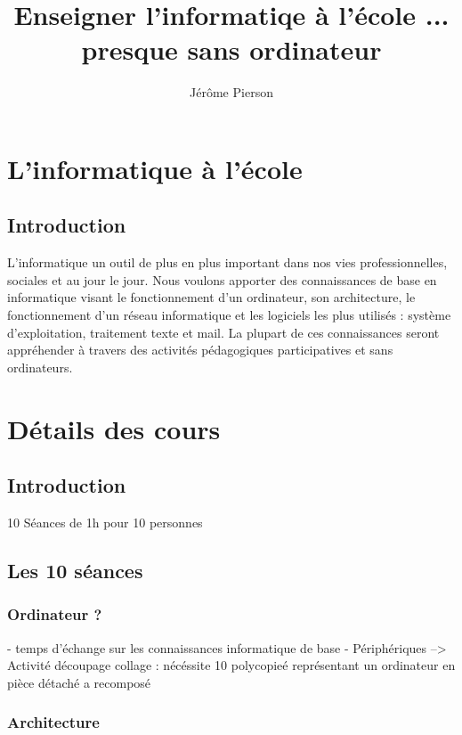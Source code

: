 \documentclass[a4paper,10pt]{report}
\title{Enseigner l'informatiqe à l'école ... presque sans ordinateur}
\author{Jérôme Pierson}
\begin{document}
\maketitle

\begin{abstract}
\end{abstract}


\part{L'informatique à l'école}
\chapter{Introduction}
L'informatique un outil de plus en plus important dans nos vies professionnelles, sociales et au jour le jour. Nous voulons apporter des connaissances de base en informatique visant le fonctionnement d'un ordinateur, son architecture, le fonctionnement d'un réseau informatique et les logiciels les plus utilisés : système d'exploitation, traitement texte et mail. La plupart de ces connaissances seront appréhender à travers des activités pédagogiques participatives et sans ordinateurs. 
\part{Détails des cours}
\chapter{Introduction}



10 Séances de 1h pour 10 personnes
\chapter{Les 10 séances}

\section{Ordinateur ?}

- temps d'échange sur les connaissances informatique de base
- Périphériques
--> Activité découpage collage : nécéssite 10 polycopieé représentant un ordinateur en pièce détaché a recomposé

\section{Architecture}
\end{document}
